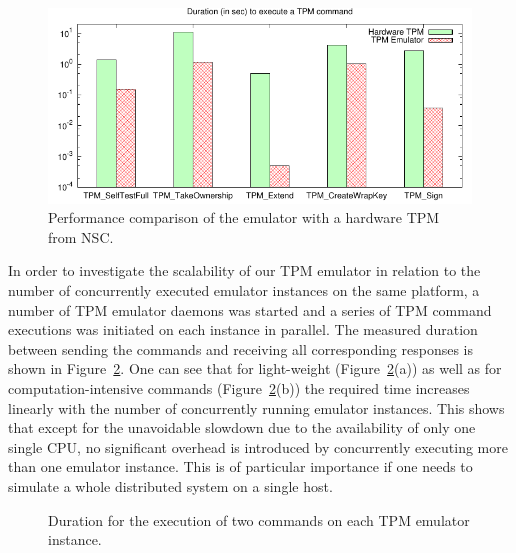 \documentclass[runningheads]{llncs}
\begin{document}
\begin{figure}
    \centering
    \includegraphics[width=.8\textwidth]{plots/performance_comparison}
    \vspace*{-2mm}
    \caption{Performance comparison of the emulator with a hardware
             TPM from NSC.}
    \label{plot:performance}\vspace*{-5mm}
\end{figure}

In order to investigate the scalability of our TPM emulator in relation to
the number of concurrently executed emulator instances on the same platform,
a number of TPM emulator daemons was started and a series of TPM command
executions was initiated on each instance in parallel. The measured duration
between sending the commands and receiving all corresponding responses is shown
in Figure~\ref{plot:execution_time}. One can see that for light-weight
(Figure~\ref{plot:execution_time}(a)) as well as for computation-intensive
commands (Figure~\ref{plot:execution_time}(b)) the required time increases
linearly with the number of concurrently running emulator instances. This
shows that except for the unavoidable slowdown due to the availability of
only one single CPU, no significant overhead is introduced by concurrently
executing more than one emulator instance. This is of particular importance
if one needs to simulate a whole distributed system on a single host.

\begin{figure}
  \centering
  \quad%
  \vspace*{-2mm}
  \caption{Duration for the execution of two commands on each TPM emulator
           instance.}
  \label{plot:execution_time}\vspace*{-5mm}
\end{figure}
\end{document}
